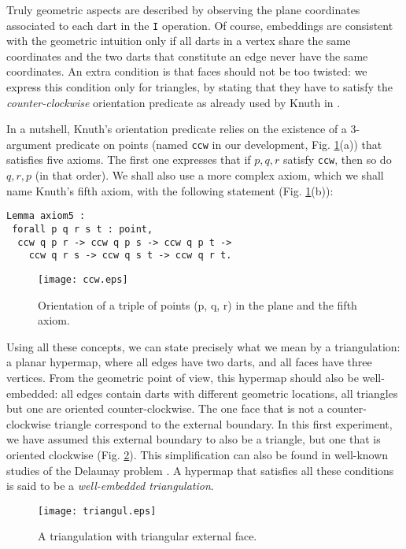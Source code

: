 \documentclass{llncs}
\begin{document}
Truly geometric aspects are described by observing the plane coordinates
associated to each dart in the {\tt I} operation.  Of course, embeddings are
consistent with the geometric intuition only if all darts in a vertex share
the same coordinates and the two darts that constitute an edge never have the
same coordinates.  An extra condition is that faces should not be too
twisted: we express this condition only for triangles, by stating that they
have to satisfy the {\em counter-clockwise} orientation predicate as already
used by Knuth in \cite{knu}.  

In a nutshell, Knuth's orientation predicate relies on the existence 
of a 3-argument predicate on points (named {\tt ccw} in our development, Fig. \ref{fig:ccw}(a)) that satisfies
five axioms.  The first one expresses that if \(p,q,r\) satisfy {\tt ccw},
then so do \(q,r,p\) (in that order).  We shall also use a more complex
axiom, which we shall name Knuth's fifth axiom, with the following statement (Fig. \ref{fig:ccw}(b)):
\begin{verbatim}
Lemma axiom5 :
 forall p q r s t : point,
  ccw q p r -> ccw q p s -> ccw q p t -> 
    ccw q r s -> ccw q s t -> ccw q r t.
\end{verbatim}
\begin{figure}
\begin{center}
\texttt{[image: ccw.eps]}
\end{center}
\caption{Orientation of a triple of points (p, q, r) in the plane
 and the fifth axiom.}
\label{fig:ccw}
\end{figure}
Using all these concepts, we can state precisely what we mean by a
triangulation: a planar hypermap, where all edges have two darts,
and all faces have three vertices.
From the geometric point of view, this hypermap should also be
well-embedded: all edges contain darts with different geometric
locations, all triangles but one are oriented counter-clockwise.  The
one face that is not a counter-clockwise triangle correspond to the
external boundary.  In this first experiment, we have assumed this
external boundary to also be a triangle, but one that is oriented
clockwise (Fig. \ref{fig:triangul}).  
This simplification can also be found in well-known studies of the
Delaunay problem \cite{gs85}.  A hypermap that satisfies all these conditions
is said to be a {\em well-embedded triangulation}.  
\begin{figure}
\begin{center}
\texttt{[image: triangul.eps]}
\end{center}
\caption{A triangulation with triangular external face.}
\label{fig:triangul}
\end{figure}
\end{document}

